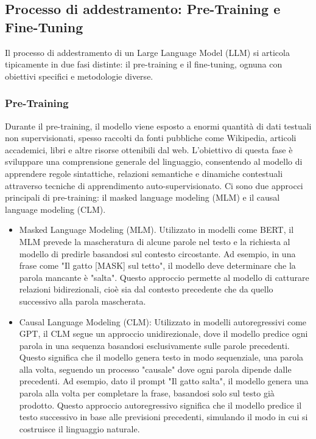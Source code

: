 \documentclass[target=mst,aauheader=,style=]{thud}
\begin{document}
\subsection{Processo di addestramento: Pre-Training e Fine-Tuning}
Il processo di addestramento di un Large Language Model (LLM) si articola tipicamente in due fasi distinte: il pre-training e il fine-tuning, ognuna con obiettivi specifici e metodologie diverse.

\subsubsection{Pre-Training}
Durante il pre-training, il modello viene esposto a enormi quantità di dati testuali non supervisionati, spesso raccolti da fonti pubbliche come Wikipedia, articoli accademici, libri e altre risorse ottenibili dal web. L’obiettivo di questa fase è sviluppare una comprensione generale del linguaggio, consentendo al modello di apprendere regole sintattiche, relazioni semantiche e dinamiche contestuali attraverso tecniche di apprendimento auto-supervisionato.
Ci sono due approcci principali di pre-training: il masked language modeling (MLM) e il causal language modeling (CLM).

\begin{itemize}
    \item Masked Language Modeling (MLM). Utilizzato in modelli come BERT, il MLM prevede la mascheratura di alcune parole nel testo e la richiesta al modello di predirle basandosi sul contesto circostante. Ad esempio, in una frase come "Il gatto [MASK] sul tetto", il modello deve determinare che la parola mancante è "salta". Questo approccio permette al modello di catturare relazioni bidirezionali, cioè sia dal contesto precedente che da quello successivo alla parola mascherata.
    \item Causal Language Modeling (CLM): Utilizzato in modelli autoregressivi come GPT, il CLM segue un approccio unidirezionale, dove il modello predice ogni parola in una sequenza basandosi esclusivamente sulle parole precedenti. Questo significa che il modello genera testo in modo sequenziale, una parola alla volta, seguendo un processo "causale" dove ogni parola dipende dalle precedenti. Ad esempio, dato il prompt "Il gatto salta", il modello genera una parola alla volta per completare la frase, basandosi solo sul testo già prodotto. Questo approccio autoregressivo significa che il modello predice il testo successivo in base alle previsioni precedenti, simulando il modo in cui si costruisce il linguaggio naturale.
\end{itemize}
\end{document}
